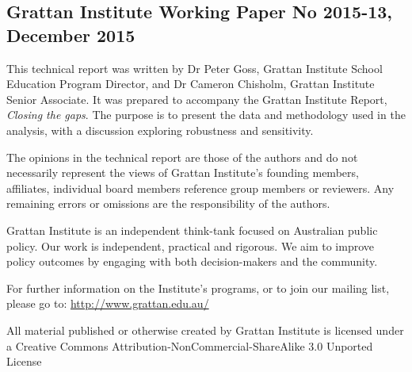 \small
\vspace{8pt}
\subsection*{Grattan Institute Working Paper No 2015-13, December 2015}

This technical report was written by Dr Peter Goss, Grattan Institute School Education Program Director, and Dr Cameron Chisholm, Grattan Institute Senior Associate. It was prepared to accompany the Grattan Institute Report, \textit{Closing the gaps}. The purpose is to present the data and methodology used in the analysis, with a discussion exploring robustness and sensitivity.


The opinions in the technical report are those of the authors and do not necessarily represent the views of Grattan Institute’s founding members, affiliates, individual board members reference group members or reviewers. Any remaining errors or omissions are the responsibility of the authors.

Grattan Institute is an independent think-tank focused on Australian public policy. Our work is independent, practical and rigorous. We aim to improve policy outcomes by engaging with both decision-makers and the community.

For further information on the Institute's programs, or to join our mailing list, please go to:
\url{http://www.grattan.edu.au/}

\footnotesize


All material published or otherwise created by Grattan Institute is licensed under a Creative Commons Attribution-NonCommercial-ShareAlike 3.0 Unported License
\normalsize